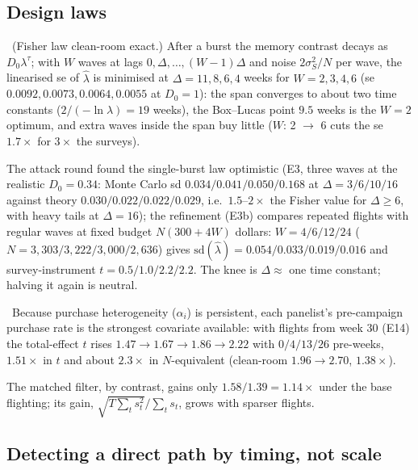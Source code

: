 \subsection{Design laws}

\begin{law}
\label{panel:law:spacing}
\tagEstablished\ (Fisher law clean-room exact.) After a burst the memory contrast decays as $D_0 \lambda^{\tau}$; with $W$ waves at lags $0, \Delta, \ldots, (W-1)\Delta$ and noise $2\sigma_S^2/N$ per wave, the linearised se of $\hat\lambda$ is minimised at $\Delta = 11, 8, 6, 4$ weeks for $W = 2, 3, 4, 6$ (se $0.0092, 0.0073, 0.0064, 0.0055$ at $D_0 = 1$): the span converges to about two time constants ($2/(-\ln\lambda) = 19$ weeks), the Box--Lucas point $9.5$ weeks is the $W = 2$ optimum, and extra waves inside the span buy little ($W$: 2 $\to$ 6 cuts the se $1.7\times$ for $3\times$ the surveys).
\end{law}

The attack round found the single-burst law optimistic (E3, three waves at the realistic $D_0 = 0.34$: Monte Carlo sd $0.034/0.041/0.050/0.168$ at $\Delta = 3/6/10/16$ against theory $0.030/0.022/0.022/0.029$, i.e.\ $1.5$--$2\times$ the Fisher value for $\Delta \ge 6$, with heavy tails at $\Delta = 16$); the refinement (E3b) compares repeated flights with regular waves at fixed budget $N(300 + 4W)$ dollars: $W = 4/6/12/24$ ($N = 3{,}303/3{,}222/3{,}000/2{,}636$) gives $\mathrm{sd}(\hat\lambda) = 0.054/0.033/0.019/0.016$ and survey-instrument $t = 0.5/1.0/2.2/2.2$. The knee is $\Delta \approx$ one time constant; halving it again is neutral.

\begin{proposition}
\label{panel:prop:preperiod}
\tagNumerical\ Because purchase heterogeneity ($\alpha_i$) is persistent, each panelist's pre-campaign purchase rate is the strongest covariate available: with flights from week 30 (E14) the total-effect $t$ rises $1.47 \to 1.67 \to 1.86 \to 2.22$ with $0/4/13/26$ pre-weeks, $1.51\times$ in $t$ and about $2.3\times$ in $N$-equivalent (clean-room $1.96 \to 2.70$, $1.38\times$).
\end{proposition}

The matched filter, by contrast, gains only $1.58/1.39 = 1.14\times$ under the base flighting; its gain, $\sqrt{T\sum_t s_t^2}/\sum_t s_t$, grows with sparser flights.

\subsection{Detecting a direct path by timing, not scale}
\label{panel:sec:shape}

